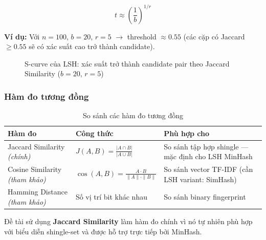 \begin{equation}
    t \approx \left(\frac{1}{b}\right)^{1/r}
\end{equation}

\textbf{Ví dụ:} Với $n = 100$, $b = 20$, $r = 5$ $\rightarrow$ threshold $\approx 0.55$ (các cặp có Jaccard $\geq 0.55$ sẽ có xác suất cao trở thành candidate).

\begin{figure}[h!]
\centering
{}
\caption{S-curve của LSH: xác suất trở thành candidate pair theo Jaccard Similarity ($b=20$, $r=5$)}
\label{fig:scurve}
\end{figure}

\subsubsection{Hàm đo tương đồng}

\begin{table}[h!]
\centering
\caption{So sánh các hàm đo tương đồng}
\label{tab:similarity-measures}
\begin{tabularx}{\textwidth}{|l|l|X|}
\hline
\textbf{Hàm đo} & \textbf{Công thức} & \textbf{Phù hợp cho} \\
\hline
Jaccard Similarity \textit{(chính)} & $J(A,B) = \frac{|A \cap B|}{|A \cup B|}$ & So sánh tập hợp shingle --- mặc định cho LSH MinHash \\
\hline
Cosine Similarity \textit{(tham khảo)} & $\cos(A,B) = \frac{A \cdot B}{\|A\| \cdot \|B\|}$ & So sánh vector TF-IDF (cần LSH variant: SimHash) \\
\hline
Hamming Distance \textit{(tham khảo)} & Số vị trí bit khác nhau & So sánh binary fingerprint \\
\hline
\end{tabularx}
\end{table}

Đề tài sử dụng \textbf{Jaccard Similarity} làm hàm đo chính vì nó tự nhiên phù hợp với biểu diễn shingle-set và được hỗ trợ trực tiếp bởi MinHash.


